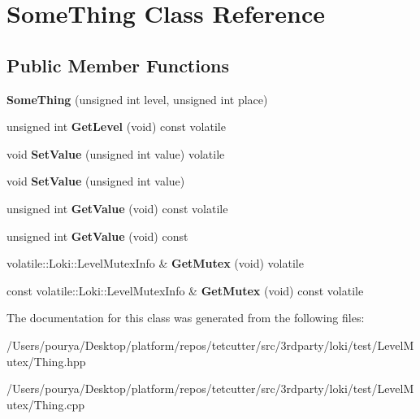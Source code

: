 \hypertarget{classSomeThing}{}\section{Some\+Thing Class Reference}
\label{classSomeThing}
\subsection*{Public Member Functions}
\begin{DoxyCompactItemize}
\item 
\hypertarget{classSomeThing_ab14407487498c24f167e2e8919f66717}{}{\bfseries Some\+Thing} (unsigned int level, unsigned int place)\label{classSomeThing_ab14407487498c24f167e2e8919f66717}

\item 
\hypertarget{classSomeThing_aaef090551e8a15be90d8e9716a1bf3c3}{}unsigned int {\bfseries Get\+Level} (void) const  volatile\label{classSomeThing_aaef090551e8a15be90d8e9716a1bf3c3}

\item 
\hypertarget{classSomeThing_af653ec05ba9031b9d09f8001aab90da9}{}void {\bfseries Set\+Value} (unsigned int value) volatile\label{classSomeThing_af653ec05ba9031b9d09f8001aab90da9}

\item 
\hypertarget{classSomeThing_ab8dd459940c0964ade79c706e51a8209}{}void {\bfseries Set\+Value} (unsigned int value)\label{classSomeThing_ab8dd459940c0964ade79c706e51a8209}

\item 
\hypertarget{classSomeThing_a4ed93b47a5ab5e55aab79216bba08dee}{}unsigned int {\bfseries Get\+Value} (void) const  volatile\label{classSomeThing_a4ed93b47a5ab5e55aab79216bba08dee}

\item 
\hypertarget{classSomeThing_a4f04a42c3d3775df98380927a2fe31b8}{}unsigned int {\bfseries Get\+Value} (void) const \label{classSomeThing_a4f04a42c3d3775df98380927a2fe31b8}

\item 
\hypertarget{classSomeThing_ade3d4eb2856413dabd024a8c09e5f6a3}{}volatile\+::\+Loki\+::\+Level\+Mutex\+Info \& {\bfseries Get\+Mutex} (void) volatile\label{classSomeThing_ade3d4eb2856413dabd024a8c09e5f6a3}

\item 
\hypertarget{classSomeThing_a5e2f269a19d228ce91c6b9d089843600}{}const volatile\+::\+Loki\+::\+Level\+Mutex\+Info \& {\bfseries Get\+Mutex} (void) const  volatile\label{classSomeThing_a5e2f269a19d228ce91c6b9d089843600}

\end{DoxyCompactItemize}


The documentation for this class was generated from the following files\+:\begin{DoxyCompactItemize}
\item 
/\+Users/pourya/\+Desktop/platform/repos/tetcutter/src/3rdparty/loki/test/\+Level\+Mutex/Thing.\+hpp\item 
/\+Users/pourya/\+Desktop/platform/repos/tetcutter/src/3rdparty/loki/test/\+Level\+Mutex/Thing.\+cpp\end{DoxyCompactItemize}
